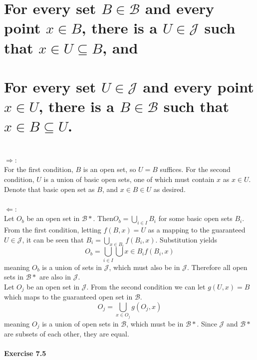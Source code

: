 \begin{parts}
 \part{For every set $B \in \mathcal{B}$ and every point $x \in B$, there is a $U \in \mathcal{J}$ such that $x \in U \subseteq B$, and}
 \part{For every set $U \in \mathcal{J}$ and every point $x \in U$, there is a $B \in \mathcal{B}$ such that$x \in B \subseteq U$.}
\end{parts}

\begin{solution}
 \\$\Rightarrow$: \\
 For the first condition, $B$ is an open set, so $U = B$ suffices. For the second condition, $U$ is a union of basic open sets, one of which must contain $x$ as $x \in U$. Denote that basic open set as $B$, and $x \in B \in U$ as desired. \\
 \\$\Leftarrow$: \\
 Let $O_b$ be an open set in $\mathcal{B}*$. Then$O_b = \bigcup_{i \in I} B_i$ for some basic open sets $B_i$. From the first condition, letting $f(B,x) = U$ as a mapping to the guaranteed $U \in \mathcal{J}$, it can be seen that $B_i = \bigcup_{x \in B_i} f(B_i, x)$. Substitution yields $$O_b = \bigcup_{i \in I} \bigcup{x \in B_i} f(B_i,x)$$ meaning $O_b$ is a union of sets in $\mathcal{J}$, which must also be in $\mathcal{J}$. Therefore all open sets in $\mathcal{B}*$ are also in $\mathcal{J}$. \\
 Let $O_j$ be an open set in $\mathcal{J}$. From the second condition we can let $g(U, x) = B$ which maps to the guaranteed open set in $\mathcal{B}$. $$O_j = \bigcup_{x \in O_j} g(O_j, x)$$ meaning $O_j$ is a union of open sets in $\mathcal{B}$, which must be in $\mathcal{B}*$. Since $\mathcal{J}$ and $\mathcal{B}*$ are subsets of each other, they are equal.
\end{solution}

\subsection{Exercise 7.5}
\setcounter{question}{0}


